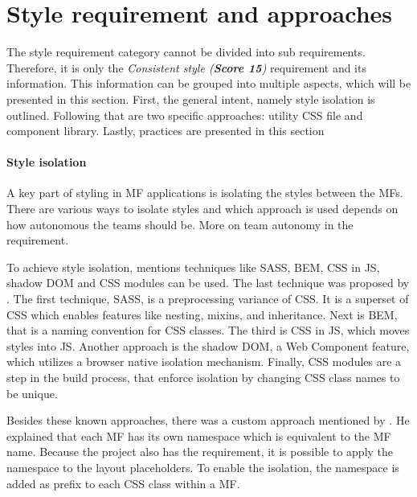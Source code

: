

\section{Style requirement and approaches}\label{cha:requirement_detail_style}

The style requirement category cannot be divided into sub requirements.
Therefore, it is only the \textit{Consistent style (\textbf{Score 15})} requirement and its information.
This information can be grouped into multiple aspects, which will be presented in this section.
First, the general intent, namely style isolation is outlined.
Following that are two specific approaches: utility \ac{CSS} file and component library.
Lastly, practices are presented in this section



\paragraph{Style isolation}

A key part of styling in \ac{MF} applications is isolating the styles between the \acp{MF}.
There are various ways to isolate styles and which approach is used depends on how autonomous the teams should be.
More on team autonomy in the \textit{} requirement.

To achieve style isolation, \textcite{Jackson.2019} mentions techniques like \ac{SASS}, \ac{BEM}, \ac{CSS} in \ac{JS}, shadow \ac{DOM} and \ac{CSS} modules can be used.
The last technique was proposed by \textcite{Laug.2018b}.
The first technique, \ac{SASS}, is a preprocessing variance of \ac{CSS}.
It is a superset of \ac{CSS} which enables features like nesting, mixins, and inheritance\footnotemark.
Next is \ac{BEM}, that is a naming convention for \ac{CSS} classes\footnotemark.
The third is \ac{CSS} in \ac{JS}, which moves styles into \ac{JS}.
Another approach is the shadow \ac{DOM}, a Web Component feature, which utilizes a browser native isolation mechanism.
Finally, \ac{CSS} modules are a step in the build process, that enforce isolation by changing \ac{CSS} class names to be unique\footnotemark.

Besides these known approaches, there was a custom approach  mentioned by \textcite{Grijzen.2019}.
He explained that each \ac{MF} has its own namespace which is equivalent to the \ac{MF} name.
Because the project also has the \textit{} requirement, it is possible to apply the namespace to the layout placeholders.
To enable the isolation, the namespace is added as prefix to each \ac{CSS} class within a \ac{MF}.

